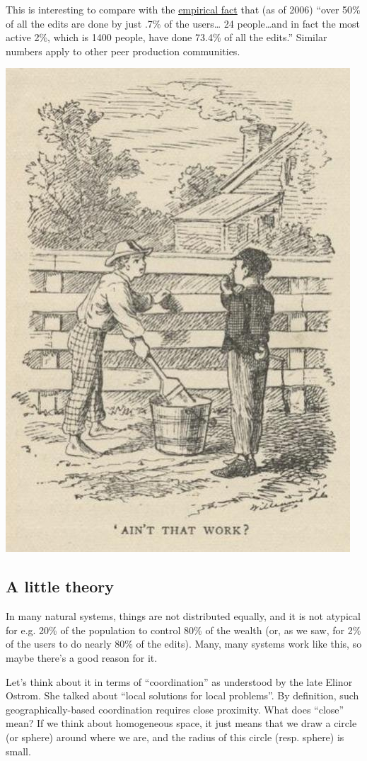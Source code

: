 This is interesting to compare with the
\href{http://www.aaronsw.com/weblog/whowriteswikipedia}{empirical fact}
that (as of 2006) ``over 50\% of all the edits are done by just .7\% of
the users\ldots{} 24 people\ldots{}and in fact the most active 2\%,
which is 1400 people, have done 73.4\% of all the edits.'' Similar
numbers apply to other peer production communities.

\begin{center}
\includegraphics[width=.6\textwidth]{../pictures/tom-sawyer.jpeg}
\end{center}

\subsection{A little theory}

In many natural systems, things are not distributed equally, and it is
not atypical for e.g. 20\% of the population to control 80\% of the
wealth (or, as we saw, for 2\% of the users to do nearly 80\% of the
edits). Many, many systems work like this, so maybe there's a good
reason for it.

Let's think about it in terms of ``coordination'' as understood by the
late Elinor Ostrom. She talked about ``local solutions for local
problems''. By definition, such geographically-based coordination
requires close proximity. What does ``close'' mean? If we think about
homogeneous space, it just means that we draw a circle (or sphere)
around where we are, and the radius of this circle (resp. sphere) is
small. 

